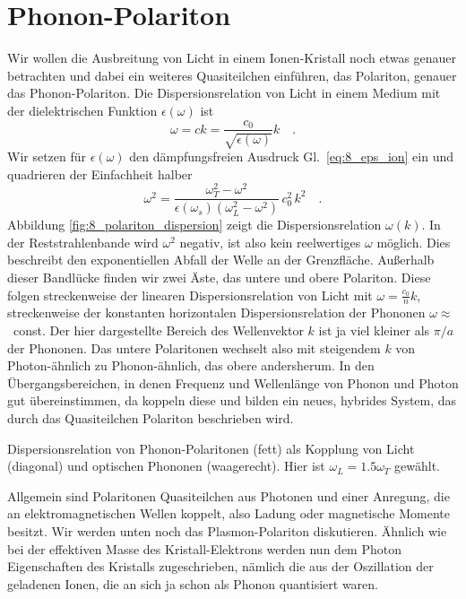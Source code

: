 \section*{Phonon-Polariton}

Wir wollen die Ausbreitung von Licht in einem Ionen-Kristall noch etwas genauer betrachten und dabei ein weiteres Quasiteilchen einführen, das Polariton, genauer das Phonon-Polariton. Die Dispersionsrelation von Licht in einem Medium mit der dielektrischen Funktion $\epsilon(\omega)$ ist
\begin{equation}
   \omega = c k = \frac{c_0}{\sqrt{\epsilon(\omega)}} k \quad . \label{eq:8_light_line}
\end{equation}
Wir setzen für $\epsilon(\omega)$ den dämpfungsfreien Ausdruck  Gl.~\ref{eq:8_eps_ion} ein und quadrieren der Einfachheit halber
\begin{equation}
    \omega^2 = \frac{\omega_T^2 - \omega^2}{ \epsilon(\omega_s) (\omega_L^2 - \omega^2)} \, c_0^2 \, k^2 \quad .
    \label{eq:8_phonon_polariton_dispersion}
\end{equation}
Abbildung \ref{fig:8_polariton_dispersion}  zeigt die Dispersionsrelation $\omega(k)$.
In der Reststrahlenbande wird $  \omega^2 $ negativ, ist also kein reelwertiges $\omega$ möglich. Dies beschreibt den exponentiellen Abfall der Welle an der Grenzfläche. Außerhalb dieser Bandlücke finden wir zwei Äste, das untere und obere Polariton. Diese folgen streckenweise der linearen Dispersionsrelation von Licht mit $ \omega =  \frac{c_0}{n} k$, streckenweise der konstanten horizontalen Dispersionsrelation der Phononen $\omega \approx$~const. Der hier dargestellte Bereich des Wellenvektor $k$ ist ja viel kleiner als $\pi/a$ der Phononen. Das untere Polaritonen wechselt also mit steigendem $k$ von Photon-ähnlich zu Phonon-ähnlich, das obere andersherum. In den Übergangsbereichen, in denen Frequenz und Wellenlänge von Phonon und Photon gut übereinstimmen, da koppeln diese und bilden ein neues, hybrides System, das durch das Quasiteilchen Polariton beschrieben wird. 

\begin{marginfigure}[-60mm]
    \caption{Dispersionsrelation von Phonon-Polaritonen (fett) als Kopplung von Licht (diagonal) und optischen Phononen (waagerecht). Hier ist $\omega_L = 1.5 \omega_T$ gewählt.
    \label{fig:8_polariton_dispersion} }
\end{marginfigure}

Allgemein sind Polaritonen Quasiteilchen aus Photonen und einer Anregung, die an elektromagnetischen Wellen koppelt, also Ladung oder magnetische Momente besitzt. Wir werden unten noch das Plasmon-Polariton diskutieren. Ähnlich wie bei der effektiven Masse des Kristall-Elektrons werden nun dem Photon Eigenschaften des Kristalls zugeschrieben, nämlich die aus der Oszillation der geladenen Ionen, die an sich ja schon als Phonon quantisiert waren.


